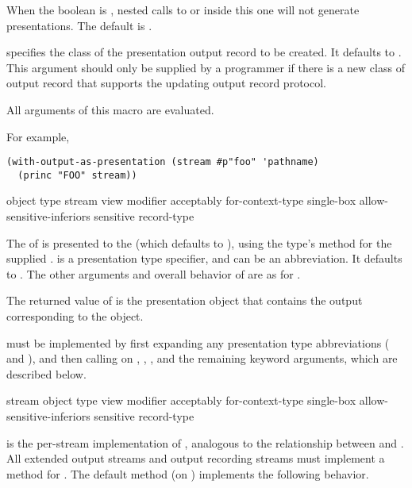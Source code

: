 When the boolean  is , nested calls
to  or  inside this one will not
generate presentations.  The default is .

 specifies the class of the presentation output record to be
created.  It defaults to .  This argument should only
be supplied by a programmer if there is a new class of output record that
supports the updating output record protocol.

All arguments of this macro are evaluated.

For example,
\begin{verbatim}
(with-output-as-presentation (stream #p"foo" 'pathname)
  (princ "FOO" stream))
\end{verbatim}


 {object \optional type
                  \key stream view modifier acceptably for-context-type
                       single-box allow-sensitive-inferiors sensitive record-type}

The  of   is presented to the
  (which defaults to
), using the type's  method for the supplied
 .   is a presentation type specifier, and can be
an abbreviation.  It defaults to .  The
other arguments and overall behavior of  are as for
.

The returned value of  is the presentation object that contains the
output corresponding to the object.

 must be implemented by first expanding any presentation type
abbreviations ( and ), and then calling
 on , , , and the remaining
keyword arguments, which are described below.

 {stream object type
                              \key view modifier acceptably for-context-type
                                   single-box allow-sensitive-inferiors sensitive 
                                   record-type}

 is the per-stream implementation of , analogous
to the relationship between  and .  All
extended output streams and output recording streams must implement a method for
.  The default method (on
) implements the following behavior.

